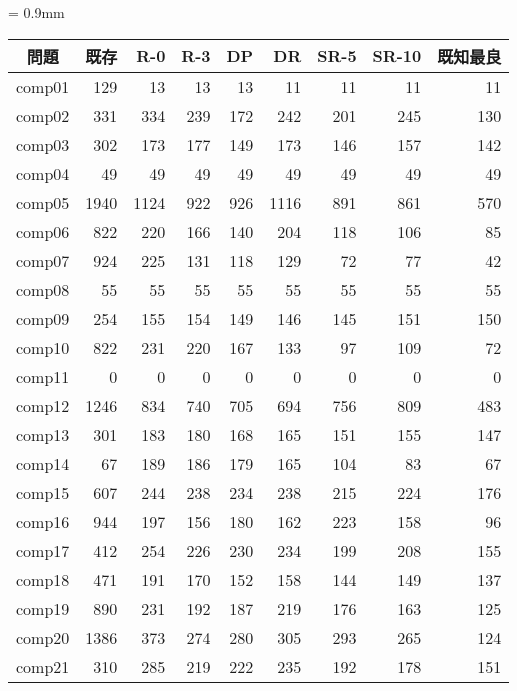 \documentclass[a4j,10pt]{jarticle}
\begin{document}
\begin{multicols}{1}
\begin{minipage}{1\linewidth}
 \centering
{}
 \renewcommand{\arraystretch}{0.7}
 \tabcolsep = 0.9mm
 \begin{tabular}{c||r|r|r|r|r|r|r||r}
問題 & 既存 & R-0 & R-3 & DP & DR & SR-5 & SR-10 & 既知最良\\\hline
comp01 & 129 & 13 & 13 & 13 & 11 & 11 & 11 & 11\\
comp02 & 331 & 334 & 239 &172 & 242 & 201 & 245 & 130\\
comp03 & 302 & 173 & 177 & 149 & 173 & 146 & 157 & 142\\
comp04 & 49 & 49 & 49 & 49 & 49 & 49 & 49 & 49\\
comp05 & 1940 & 1124 & 922 & 926 & 1116 & 891 & 861 & 570\\
comp06 & 822 & 220 & 166 & 140 & 204 & 118 & 106 & 85\\
comp07 & 924 & 225 & 131 & 118 & 129 & 72 & 77 & 42\\
comp08 & 55 & 55 & 55 & 55 & 55 & 55 & 55 & 55\\
comp09 & 254 & 155 & 154 & 149 & 146 & 145 & 151 & 150\\
comp10 & 822 & 231 & 220 & 167 & 133 & 97 & 109 & 72\\
comp11 & 0 & 0 & 0 & 0 & 0 & 0 & 0 & 0\\
comp12 & 1246 & 834 & 740 & 705 & 694 & 756 & 809 & 483\\
comp13 & 301 & 183 & 180 & 168 & 165 & 151 & 155 & 147\\
comp14 & 67 & 189 & 186 & 179 & 165 & 104 & 83 & 67\\
comp15 & 607 & 244 & 238 & 234 & 238 & 215 & 224 & 176\\
comp16 & 944 & 197 & 156 & 180 & 162 & 223 & 158 & 96\\
comp17 & 412 & 254 & 226 & 230 & 234 & 199 & 208 & 155\\
comp18 & 471 & 191 & 170 & 152 & 158 & 144 & 149 & 137\\
comp19 & 890 & 231 & 192 & 187 & 219 & 176 & 163 & 125\\
comp20 & 1386 & 373 & 274 & 280 & 305 & 293 & 265 & 124\\
comp21 & 310 & 285 & 219 & 222 & 235 & 192 & 178 & 151\\\hline
 \end{tabular}
 \label{tab:result}
\end{minipage}


\end{multicols}
\end{document}
